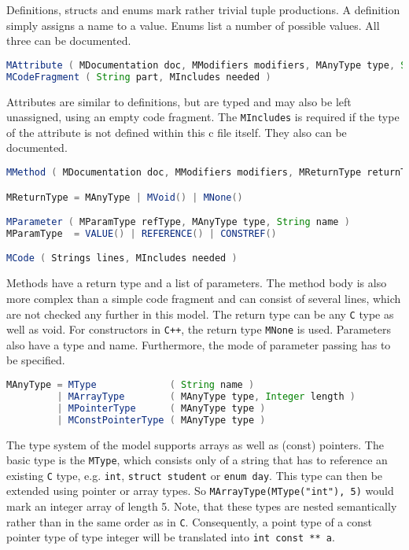 \documentclass{report}
\begin{document}
Definitions, structs and enums mark rather trivial tuple productions. A definition simply assigns a name to a value. %
Enums list a number of possible values. All three can be documented.

\begin{lstlisting}[language=java, breaklines=true]
MAttribute ( MDocumentation doc, MModifiers modifiers, MAnyType type, String name, MCodeFragment initial )
MCodeFragment ( String part, MIncludes needed )
\end{lstlisting}

Attributes are similar to definitions, but are typed and may also be left unassigned, using an empty code fragment. The \texttt{MIncludes} is required if the type of the attribute is not defined within this c file itself. They also can be documented.

\begin{lstlisting}[language=java, breaklines=true]
MMethod ( MDocumentation doc, MModifiers modifiers, MReturnType returnType, String name, MParameters parameter, MCode body )

MReturnType = MAnyType | MVoid() | MNone()

MParameter ( MParamType refType, MAnyType type, String name )
MParamType  = VALUE() | REFERENCE() | CONSTREF()

MCode ( Strings lines, MIncludes needed )
\end{lstlisting}

Methods have a return type and a list of parameters. The method body is also more complex than a simple code fragment and can consist of several lines, which are not checked any further in this model. The return type can be any \texttt{C} type as well as void. For constructors in \texttt{C++}, the return type \texttt{MNone} is used. Parameters also have a type and name. Furthermore, the mode of parameter passing has to be specified.

\begin{lstlisting}[language=java, breaklines=true]
MAnyType = MType             ( String name )
         | MArrayType        ( MAnyType type, Integer length )
         | MPointerType      ( MAnyType type )
         | MConstPointerType ( MAnyType type )
\end{lstlisting}

The type system of the model supports arrays as well as (const) pointers. The basic type is the \texttt{MType}, which consists only of a string that has to reference an existing \texttt{C} type, e.g. \texttt{int}, \texttt{struct student} or \texttt{enum day}. This type can then be extended using pointer or array types. So \texttt{MArrayType(MType("int"), 5)} would mark an integer array of length 5. Note, that these types are nested semantically rather than in the same order as in \texttt{C}. Consequently, a point type of a const pointer type of type integer will be translated into \texttt{int const ** a}.
\end{document}
